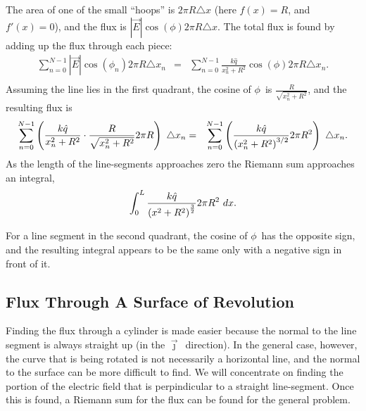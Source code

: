 The area of one of the small ``hoops'' is $2\pi R \triangle x$ (here
$f(x)=R$, and $f'(x)=0$), and the flux is $|\vec{E}|\cos(\phi) 2\pi R
\triangle x$. The total flux is found by adding up the flux through
each piece:
\begin{eqnarray*}
  \sum^{N-1}_{n=0} |\vec{E}|\cos(\phi_n) 2\pi R \triangle x_n & = &
  \sum^{N-1}_{n=0} \frac{k\hat{q}}{x_n^2+R^2} \cos(\phi)
      2\pi R \triangle x_n.\\
\end{eqnarray*}
Assuming the line lies in the first quadrant, the cosine of $\phi$\ is
$\frac{R}{\sqrt{x_n^2+R^2}}$, and the resulting flux is
\begin{eqnarray*}
\sum^{N-1}_{n=0} \left( \frac{k\hat{q}}{x_n^2+R^2} \cdot
                     \frac{R}{\sqrt{x_n^2+R^2}}
      2\pi R \right) ~ \triangle x_n
  & = & \sum^{N-1}_{n=0} \left( \frac{k\hat{q}}{\left( x_n^2+R^2 \right)^{3/2}}
      2\pi R^2 \right) ~ \triangle x_n.
\end{eqnarray*}
As the length of the line-segments approaches zero the Riemann sum
approaches an integral,
\begin{eqnarray*}
  \int^L_{0} \frac{k\hat{q}}{\left({x^2+R^2}\right)^{\frac{3}{2}}}
      2\pi R^2 ~dx.
\end{eqnarray*}

For a line segment in the second quadrant, the cosine of $\phi$\ has
the opposite sign, and the resulting integral appears to be the same
only with a negative sign in front of it.


\subsection{Flux Through A Surface of Revolution}
Finding the flux through a cylinder is made easier because the normal
to the line segment is always straight up (in the $\vec{\jmath}$\
direction). In the general case, however, the curve that is being
rotated is not necessarily a horizontal line, and the normal to the
surface can be more difficult to find. We will concentrate on finding
the portion of the electric field that is perpindicular to a straight
line-segment. Once this is found, a Riemann sum for the flux can be
found for the general problem.

